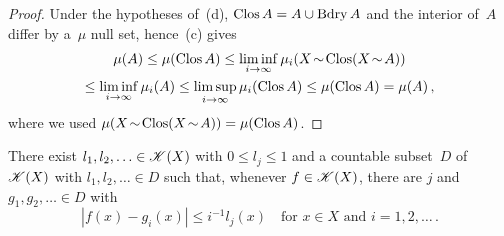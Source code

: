 \begin{proof}
    Under the hypotheses of~(d), $\mathop{\mathrm{Clos}}A = A \cup \operatorname{Bdry} A$ and the interior of~$A$ differ by
    a~$\mu$ null set, hence~(c) gives
    \begin{multline*}
        \mu(A) \le \mu(\mathop{\mathrm{Clos}}A) \le \liminf_{i \to \infty} \mu_i(X \!\sim\! \mathop{\mathrm{Clos}}(X \!\sim\! A))
        \\ \le \liminf_{i \to \infty} \mu_i(A) \le \limsup_{i \to \infty} \mu_i(\mathop{\mathrm{Clos}}A) \le
        \mu(\mathop{\mathrm{Clos}}A) = \mu(A) \,,
    \end{multline*}
    where we used $\mu(X \!\sim\! \mathop{\mathrm{Clos}}(X \!\sim\! A)) = \mu(\mathop{\mathrm{Clos}}A)$. \qedhere
\end{proof}

\begin{lemma}[new]
    \label{new:countable_dense}
    There exist $l_1, l_2, \ldots \in \mathscr{K}(X)$ with $0 \le l_j \le 1$ and a countable
    subset~$D$ of $\mathscr{K}(X)$ with $l_1, l_2, \ldots \in D$ such that, whenever $f \in
    \mathscr{K}(X)$, there are $j$ and $g_1, g_2, \ldots \in D$ with
    \begin{displaymath}
        |f(x) - g_i(x)| \le i^{-1} l_j(x) \quad \text{for $x \in X$ and $i = 1, 2, \ldots$} \,.
    \end{displaymath}
\end{lemma}


